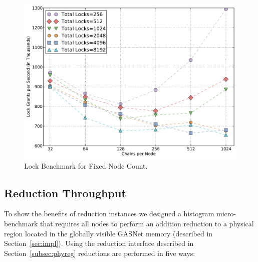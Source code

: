 \begin{figure}
\begin{center}
\includegraphics[scale=0.33]{figs/fixed_node_lock.pdf}
\end{center}
\vspace{-6mm}
\caption{Lock Benchmark for Fixed Node Count.\label{fig:fixednode}}
\vspace{-4mm}
\end{figure}


\subsection{Reduction Throughput}
\label{subsec:reducmicro}
To show the benefits of reduction instances we designed
a histogram micro-benchmark that requires all nodes to perform an addition reduction to a
physical region located in the globally visible GASNet memory (described in 
Section~\ref{sec:impl}).  Using the reduction interface described in Section~\ref{subsec:phyreg}
reductions are performed in five ways:

